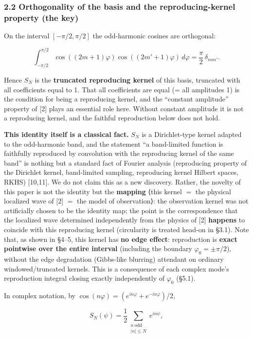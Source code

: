 \documentclass[
]{ltjsarticle}
\begin{document}
\subsubsection{2.2 Orthogonality of the basis and the reproducing-kernel
property (the
key)}\label{orthogonality-of-the-basis-and-the-reproducing-kernel-property-the-key}

On the interval \([-\pi/2,\pi/2]\) the odd-harmonic cosines are
orthogonal:

\[
\int_{-\pi/2}^{\pi/2}\cos((2m+1)\varphi)\cos((2m'+1)\varphi)\,d\varphi=\frac{\pi}{2}\,\delta_{mm'}.
\]

Hence \(S_N\) is the \textbf{truncated reproducing kernel} of this
basis, truncated with all coefficients equal to 1. That all coefficients
are equal (= all amplitudes 1) is the condition for being a reproducing
kernel, and the ``constant amplitude'' property of {[}2{]} plays an
essential role here. Without constant amplitude it is not a reproducing
kernel, and the faithful reproduction below does not hold.

\textbf{This identity itself is a classical fact.} \(S_N\) is a
Dirichlet-type kernel adapted to the odd-harmonic band, and the
statement ``a band-limited function is faithfully reproduced by
convolution with the reproducing kernel of the same band'' is nothing
but a standard fact of Fourier analysis (reproducing property of the
Dirichlet kernel, band-limited sampling, reproducing kernel Hilbert
spaces, RKHS) {[}10,11{]}. We do not claim this as a new discovery.
Rather, the novelty of this paper is not the identity but the
\textbf{mapping} ⟨this kernel \(=\) the physical localized wave of
{[}2{]} \(=\) the model of observation⟩: the observation kernel was not
artificially chosen to be the identity map; the point is the
correspondence that the localized wave determined independently from the
physics of {[}2{]} \textbf{happens} to coincide with this reproducing
kernel (circularity is treated head-on in §3.1). Note that, as shown in
§4--5, this kernel has \textbf{no edge effect}: reproduction is
\textbf{exact pointwise over the entire interval} (including the
boundary \(\varphi_0=\pm\pi/2\)), without the edge degradation
(Gibbs-like blurring) attendant on ordinary windowed/truncated kernels.
This is a consequence of each complex mode's reproduction integral
closing exactly independently of \(\varphi_0\) (§5.1).

In complex notation, by
\(\cos(n\varphi)=(e^{in\varphi}+e^{-in\varphi})/2\),

\[
S_N(\psi)=\frac12\!\!\sum_{\substack{n\ \text{odd}\\|n|\le N}}\!\! e^{in\psi},
\]
\end{document}
